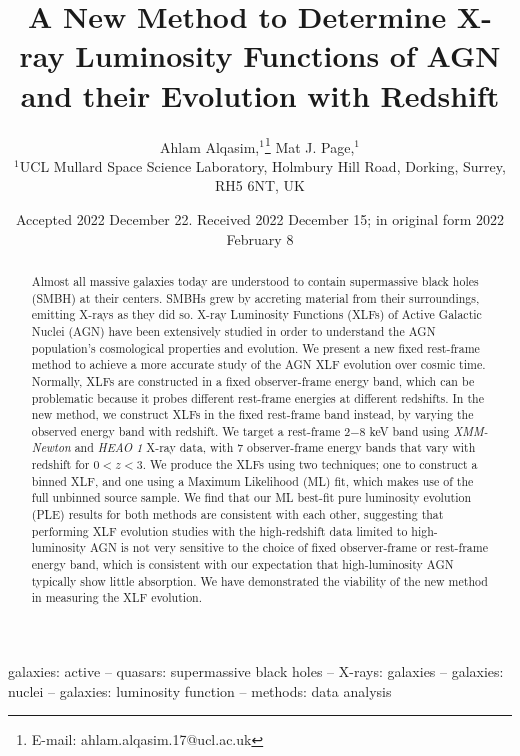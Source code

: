 \documentclass[fleqn,usenatbib]{mnras}
\title[Redshifted XLF method for AGN]{A New Method to Determine X-ray Luminosity Functions of AGN and their Evolution with Redshift}
\author[A. Alqasim et al.]{
Ahlam Alqasim,$^{1}$\thanks{E-mail: ahlam.alqasim.17@ucl.ac.uk}
Mat J. Page,$^{1}$
\\
$^{1}$UCL Mullard Space Science Laboratory, Holmbury Hill Road, Dorking, Surrey, RH5 6NT, UK
}
\date{Accepted 2022 December 22. Received 2022 December 15; in original form 2022 February 8}
\begin{document}
\label{firstpage}
\pagerange{\pageref{firstpage}--\pageref{lastpage}}
\maketitle

\begin{abstract}
Almost all massive galaxies today are understood to contain supermassive black holes (SMBH) at their centers. 
SMBHs grew by accreting material from their surroundings, emitting X-rays as they did so. 
X-ray Luminosity Functions (XLFs) of Active Galactic Nuclei (AGN) have been extensively studied in order to understand the AGN population's cosmological properties and evolution. 
We present a new fixed rest-frame method to achieve a more accurate study of the AGN XLF evolution over cosmic time. 
Normally, XLFs are constructed in a fixed observer-frame energy band, which can be problematic because it probes different rest-frame energies at different redshifts. 
In the new method, we construct XLFs in the fixed rest-frame band instead, by varying the observed energy band with redshift. 
We target a rest-frame 2$-$8 keV band using \textit{XMM-Newton} and \textit{HEAO 1} X-ray data, with 7 observer-frame energy bands that vary with redshift for $0 < z < 3$.
We produce the XLFs using two techniques; one to construct a binned XLF, and one using a Maximum Likelihood (ML) fit, which makes use of the full unbinned source sample. 
We find that our ML best-fit pure luminosity evolution (PLE) results for both methods are consistent with each other, suggesting that performing XLF evolution studies with the high-redshift data limited to high-luminosity AGN is not very sensitive to the choice of fixed observer-frame or rest-frame energy band, which is consistent with our expectation that high-luminosity AGN typically show little absorption. 
We have demonstrated the viability of the new method in measuring the XLF evolution.
\end{abstract}

\begin{keywords}
galaxies: active --
quasars: supermassive black holes -- 
X-rays: galaxies -- 
galaxies: nuclei -- 
galaxies: luminosity function -- 
methods: data analysis
\end{keywords}


\end{document}

